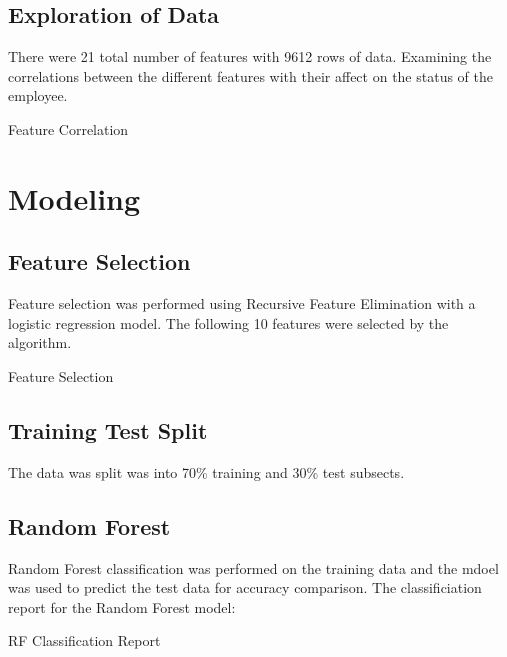 \documentclass{homework}
\begin{document}
\newpage
\subsection{Exploration of Data}

There were 21 total number of features with 9612 rows of data. Examining the correlations between the different features with their affect on the status of the employee.  

\begin{table}[h]
    \caption{Feature Correlation}
    \label{Unprocessed Data}
    \centering
    
\end{table}

\section{Modeling}

\subsection{Feature Selection}

Feature selection was performed using Recursive Feature Elimination with a logistic regression model. The following 10 features were selected by the algorithm.  

\begin{table}[h]
    \caption{Feature Selection}
    \label{Unprocessed Data}
    \centering
    
\end{table}

\subsection{Training Test Split}

The data was split was into 70\% training and 30\% test subsects. 

\newpage
\subsection{Random Forest}

Random Forest classification was performed on the training data and the mdoel was used to predict the test data for accuracy comparison. The classificiation report for the Random Forest model: 

\begin{table}[h]
    \caption{RF Classification Report}
    \label{Unprocessed Data}
    \centering
    
\end{table}
\end{document}
